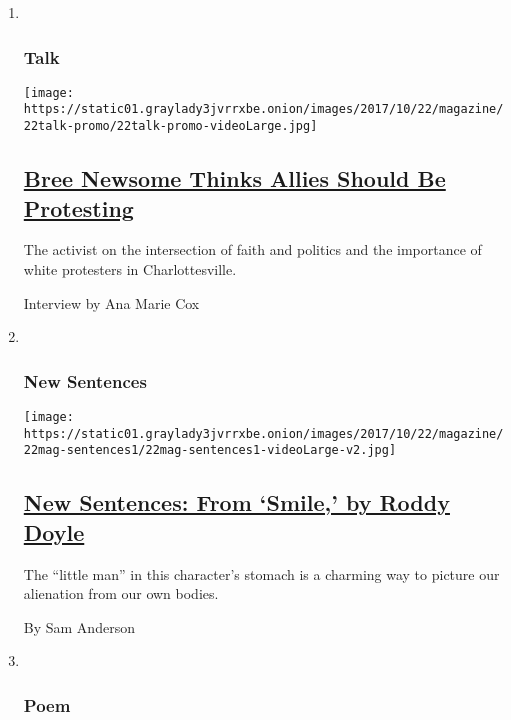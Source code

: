 \begin{enumerate}
\def\labelenumi{\arabic{enumi}.}
\item ~
  \hypertarget{talk}{%
  \subsubsection{Talk}\label{talk}}

  \texttt{[image: https://static01.graylady3jvrrxbe.onion/images/2017/10/22/magazine/22talk-promo/22talk-promo-videoLarge.jpg]}

  \hypertarget{bree-newsome-thinks-allies-should-be-protesting}{%
  \subsection{\texorpdfstring{\href{/2017/10/18/magazine/bree-newsome-thinks-allies-should-be-protesting.html}{Bree
  Newsome Thinks Allies Should Be
  Protesting}}{Bree Newsome Thinks Allies Should Be Protesting}}\label{bree-newsome-thinks-allies-should-be-protesting}}

  The activist on the intersection of faith and politics and the
  importance of white protesters in Charlottesville.

  Interview by Ana Marie Cox
\item ~
  \hypertarget{new-sentences}{%
  \subsubsection{New Sentences}\label{new-sentences}}

  \texttt{[image: https://static01.graylady3jvrrxbe.onion/images/2017/10/22/magazine/22mag-sentences1/22mag-sentences1-videoLarge-v2.jpg]}

  \hypertarget{new-sentences-from-smile-by-roddy-doyle}{%
  \subsection{\texorpdfstring{\href{/2017/10/20/magazine/new-sentences-from-smile-by-roddy-doyle.html}{New
  Sentences: From `Smile,' by Roddy
  Doyle}}{New Sentences: From `Smile,' by Roddy Doyle}}\label{new-sentences-from-smile-by-roddy-doyle}}

  The ``little man'' in this character's stomach is a charming way to
  picture our alienation from our own bodies.

  By Sam Anderson
\item ~
  \hypertarget{poem}{%
  \subsubsection{Poem}\label{poem}}


\end{enumerate}
